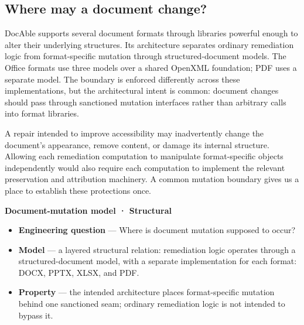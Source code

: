 \subsection{Where may a document change?}\label{heading:where-may-a-document-change}

DocAble supports several document formats through libraries powerful enough to alter their underlying structures. Its architecture separates ordinary remediation logic from format-specific mutation through structured-document models. The Office formats use three models over a shared OpenXML foundation; PDF uses a separate model. The boundary is enforced differently across these implementations, but the architectural intent is common: document changes should pass through sanctioned mutation interfaces rather than arbitrary calls into format libraries.

A repair intended to improve accessibility may inadvertently change the document’s appearance, remove content, or damage its internal structure. Allowing each remediation computation to manipulate format-specific objects independently would also require each computation to implement the relevant preservation and attribution machinery. A common mutation boundary gives us a place to establish these protections once.

\textbf{Document-mutation model · Structural}

\begin{itemize}
\tightlist
\item
  \textbf{Engineering question} --- Where is document mutation supposed to occur?
\end{itemize}

\begin{itemize}
\tightlist
\item
  \textbf{Model} --- a layered structural relation: remediation logic operates through a structured-document model, with a separate implementation for each format: DOCX, PPTX, XLSX, and PDF.
\end{itemize}

\begin{itemize}
\tightlist
\item
  \textbf{Property} --- the intended architecture places format-specific mutation behind one sanctioned seam; ordinary remediation logic is not intended to bypass it.
\end{itemize}

